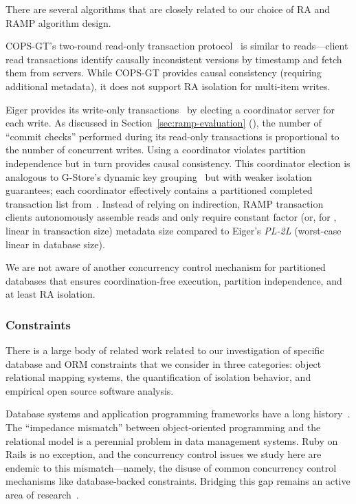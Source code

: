 
 There are several algorithms that are
closely related to our choice of RA and RAMP algorithm design.

COPS-GT's two-round read-only transaction protocol~\cite{cops} is
similar to \rapl reads---client read transactions identify causally
inconsistent versions by timestamp and fetch them from servers. While
COPS-GT provides causal consistency (requiring additional metadata),
it does not support RA isolation for multi-item writes.

Eiger provides its write-only transactions~\cite{eiger} by electing a
coordinator server for each write. As discussed in
Section~\ref{sec:ramp-evaluation} (\mstr), the number of ``commit checks''
performed during its read-only transactions is proportional to the
number of concurrent writes. Using a coordinator violates partition
independence but in turn provides causal consistency. This coordinator
election is analogous to G-Store's dynamic key grouping~\cite{gstore}
but with weaker isolation guarantees; each coordinator effectively
contains a partitioned completed transaction list
from~\cite{readonly}. Instead of relying on indirection, RAMP
transaction clients autonomously assemble reads and only require
constant factor (or, for \rapl, linear in transaction size) metadata
size compared to Eiger's \textit{PL-2L} (worst-case linear in database
size).

We are not aware of another concurrency control mechanism for
partitioned databases that ensures coordination-free execution,
partition independence, and at least RA isolation.

\subsubsection{Constraints}

There is a large body of related work related to our investigation of
specific database and ORM constraints that we consider in three
categories: object relational mapping systems, the quantification of
isolation behavior, and empirical open source software analysis.

 Database systems and application programming
frameworks have a long
history~\cite{objectstore,shore,bernstein-orm}. The ``impedance
mismatch'' between object-oriented programming and the relational
model is a perennial problem in data management systems. Ruby on Rails
is no exception, and the concurrency control issues we study here are
endemic to this mismatch---namely, the disuse of common concurrency
control mechanisms like database-backed constraints. Bridging this gap
remains an active area of research~\cite{db-to-model}.

